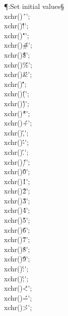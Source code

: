 \Y\P\?\4:Set initial values\X\S\?\6
\\{xchr}\?\1(\2)\K\?\.{\'\ \'};\5
\\{xchr}\?\1(\2)\K\?\.{\'!\'};\5
\\{xchr}\?\1(\2)\K\?\.{\'"\'};\5
\\{xchr}\?\1(\2)\K\?\.{\'\#\'};\5
\\{xchr}\?\1(\2)\K\?\.{\'\$\'};\5
\\{xchr}\?\1(\2)\K\?\.{\'\%\'};\5
\\{xchr}\?\1(\2)\K\?\.{\'\&\'};\5
\\{xchr}\?\1(\2)\K\?\.{\'\'\'};\6
\\{xchr}\?\1(\2)\K\?\.{\'(\'};\5
\\{xchr}\?\1(\2)\K\?\.{\')\'};\5
\\{xchr}\?\1(\2)\K\?\.{\'*\'};\5
\\{xchr}\?\1(\2)\K\?\.{\'+\'};\5
\\{xchr}\?\1(\2)\K\?\.{\',\'};\5
\\{xchr}\?\1(\2)\K\?\.{\'-\'};\5
\\{xchr}\?\1(\2)\K\?\.{\'.\'};\5
\\{xchr}\?\1(\2)\K\?\.{\'/\'};\6
\\{xchr}\?\1(\2)\K\?\.{\'0\'};\5
\\{xchr}\?\1(\2)\K\?\.{\'1\'};\5
\\{xchr}\?\1(\2)\K\?\.{\'2\'};\5
\\{xchr}\?\1(\2)\K\?\.{\'3\'};\5
\\{xchr}\?\1(\2)\K\?\.{\'4\'};\5
\\{xchr}\?\1(\2)\K\?\.{\'5\'};\5
\\{xchr}\?\1(\2)\K\?\.{\'6\'};\5
\\{xchr}\?\1(\2)\K\?\.{\'7\'};\6
\\{xchr}\?\1(\2)\K\?\.{\'8\'};\5
\\{xchr}\?\1(\2)\K\?\.{\'9\'};\5
\\{xchr}\?\1(\2)\K\?\.{\':\'};\5
\\{xchr}\?\1(\2)\K\?\.{\';\'};\5
\\{xchr}\?\1(\2)\K\?\.{\'<\'};\5
\\{xchr}\?\1(\2)\K\?\.{\'=\'};\5
\\{xchr}\?\1(\2)\K\?\.{\'>\'};\5

